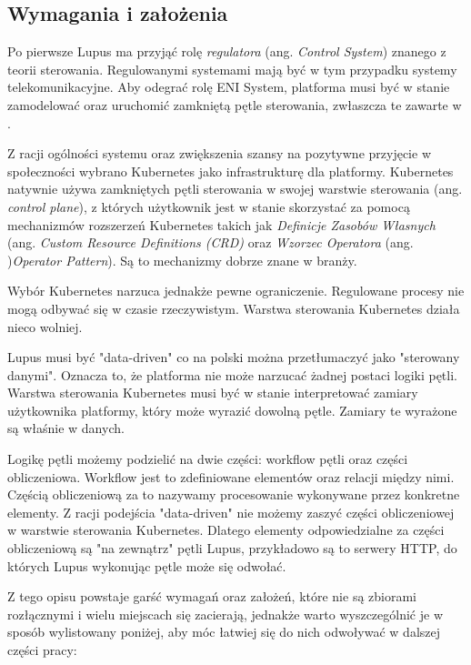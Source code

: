 \subsection{Wymagania i założenia}

Po pierwsze Lupus ma przyjąć rolę \textit{regulatora} (ang. \textit{Control System}) znanego z teorii sterowania. Regulowanymi systemami mają być w tym przypadku systemy telekomunikacyjne. Aby odegrać rolę ENI System, platforma musi być w stanie zamodelować oraz uruchomić  zamkniętą pętle sterowania, zwłaszcza te zawarte w \cite{enioverview}. 

Z racji ogólności systemu oraz zwiększenia szansy na pozytywne przyjęcie w społeczności wybrano Kubernetes jako infrastrukturę dla platformy. Kubernetes natywnie używa zamkniętych pętli sterowania w swojej warstwie sterowania (ang. \textit{control plane}), z których użytkownik jest w stanie skorzystać za pomocą mechanizmów rozszerzeń Kubernetes takich jak \textit{Definicje Zasobów Własnych} (ang. \textit{Custom Resource Definitions (CRD)} oraz \textit{Wzorzec Operatora} (ang. )\textit{Operator Pattern}). Są to mechanizmy dobrze znane w branży. 

Wybór Kubernetes narzuca jednakże pewne ograniczenie. Regulowane procesy nie mogą odbywać się w czasie rzeczywistym. Warstwa sterowania Kubernetes działa nieco wolniej. 

Lupus musi być "data-driven" co na polski można przetłumaczyć jako "sterowany danymi". Oznacza to, że platforma nie może narzucać żadnej postaci logiki pętli. Warstwa sterowania Kubernetes musi być w stanie interpretować zamiary użytkownika platformy, który może wyrazić dowolną pętle. Zamiary te wyrażone są właśnie w danych. 

Logikę pętli możemy podzielić na dwie części: workflow pętli oraz części obliczeniowa. Workflow jest to zdefiniowane elementów oraz relacji między nimi. Częścią obliczeniową za to nazywamy procesowanie wykonywane przez konkretne elementy. Z racji podejścia "data-driven" nie możemy zaszyć części obliczeniowej w warstwie sterowania Kubernetes. Dlatego elementy odpowiedzialne za części obliczeniową są "na zewnątrz" pętli Lupus, przykładowo są to serwery HTTP, do których Lupus wykonując pętle może się odwołać.

Z tego opisu powstaje garść wymagań oraz założeń, które nie są zbiorami rozłącznymi i wielu miejscach się zacierają, jednakże warto wyszczególnić je w sposób wylistowany poniżej, aby móc łatwiej się do nich odwoływać w dalszej części pracy:

